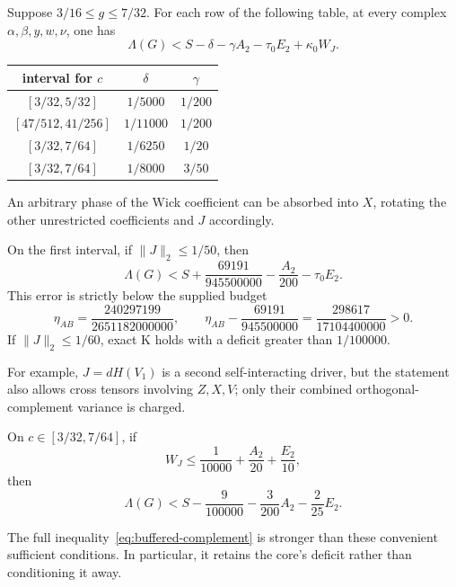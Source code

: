 \begin{theorem}
\label{thm:buffered-complement}
Suppose $3/16\le g\le7/32$. For each row of the following table, at every complex $\alpha,\beta,y,w,\nu$, one has
\begin{equation}
 \boxed{\Lambda(G)<S-\delta-\gamma A_2-\tau_0 E_2+\kappa_0W_J.}
 \label{eq:buffered-complement}
\end{equation}
\begin{center}
\begin{tabular}{ccc}\toprule
interval for $c$ & $\delta$ & $\gamma$\\\midrule
$[3/32,5/32]$ & $1/5000$ & $1/200$\\
$[47/512,41/256]$ & $1/11000$ & $1/200$\\
$[3/32,7/64]$ & $1/6250$ & $1/20$\\
$[3/32,7/64]$ & $1/8000$ & $3/50$\\\bottomrule
\end{tabular}
\end{center}
An arbitrary phase of the Wick coefficient can be absorbed into $X$, rotating the other unrestricted coefficients and $J$ accordingly.
\end{theorem}

\begin{corollary}
On the first interval, if $\|J\|_2\le1/50$, then
\[
 \Lambda(G)<S+\frac{69191}{945500000}-\frac{A_2}{200}-\tau_0E_2.
\]
This error is strictly below the supplied budget
\[
 \eta_{AB}=\frac{240297199}{2651182000000},\qquad
 \eta_{AB}-\frac{69191}{945500000}=\frac{298617}{17104400000}>0.
\]
If $\|J\|_2\le1/60$, exact K holds with a deficit greater than $1/100000$.
\end{corollary}
For example, $J=dH(V_1)$ is a second self-interacting driver, but the statement also allows cross tensors involving $Z,X,V$; only their combined orthogonal-complement variance is charged.

\begin{corollary}
On $c\in[3/32,7/64]$, if
\[
 W_J\le\frac1{10000}+\frac{A_2}{20}+\frac{E_2}{10},
\]
then
\[
 \Lambda(G)<S-\frac9{100000}-\frac3{200}A_2-\frac2{25}E_2.
\]
\end{corollary}
The full inequality~\eqref{eq:buffered-complement} is stronger than these convenient sufficient conditions. In particular, it retains the core's deficit rather than conditioning it away.

